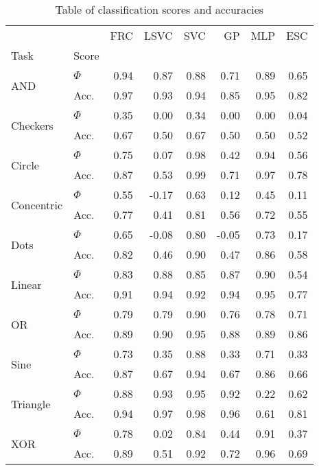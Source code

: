 \begin{table}
\centering
\caption{Table of classification scores and accuracies}
\label{tbl:classification_scores}
\begin{tabular}{llrrrrrr}
\toprule
 &  & FRC & LSVC & SVC & GP & MLP & ESC \\
Task & Score &  &  &  &  &  &  \\
\midrule
\multirow[t]{2}{*}{AND} & $\Phi$ & 0.94 & 0.87 & 0.88 & 0.71 & 0.89 & 0.65 \\
 & Acc. & 0.97 & 0.93 & 0.94 & 0.85 & 0.95 & 0.82 \\
\cline{1-8}
\multirow[t]{2}{*}{Checkers} & $\Phi$ & 0.35 & 0.00 & 0.34 & 0.00 & 0.00 & 0.04 \\
 & Acc. & 0.67 & 0.50 & 0.67 & 0.50 & 0.50 & 0.52 \\
\cline{1-8}
\multirow[t]{2}{*}{Circle} & $\Phi$ & 0.75 & 0.07 & 0.98 & 0.42 & 0.94 & 0.56 \\
 & Acc. & 0.87 & 0.53 & 0.99 & 0.71 & 0.97 & 0.78 \\
\cline{1-8}
\multirow[t]{2}{*}{Concentric} & $\Phi$ & 0.55 & -0.17 & 0.63 & 0.12 & 0.45 & 0.11 \\
 & Acc. & 0.77 & 0.41 & 0.81 & 0.56 & 0.72 & 0.55 \\
\cline{1-8}
\multirow[t]{2}{*}{Dots} & $\Phi$ & 0.65 & -0.08 & 0.80 & -0.05 & 0.73 & 0.17 \\
 & Acc. & 0.82 & 0.46 & 0.90 & 0.47 & 0.86 & 0.58 \\
\cline{1-8}
\multirow[t]{2}{*}{Linear} & $\Phi$ & 0.83 & 0.88 & 0.85 & 0.87 & 0.90 & 0.54 \\
 & Acc. & 0.91 & 0.94 & 0.92 & 0.94 & 0.95 & 0.77 \\
\cline{1-8}
\multirow[t]{2}{*}{OR} & $\Phi$ & 0.79 & 0.79 & 0.90 & 0.76 & 0.78 & 0.71 \\
 & Acc. & 0.89 & 0.90 & 0.95 & 0.88 & 0.89 & 0.86 \\
\cline{1-8}
\multirow[t]{2}{*}{Sine} & $\Phi$ & 0.73 & 0.35 & 0.88 & 0.33 & 0.71 & 0.33 \\
 & Acc. & 0.87 & 0.67 & 0.94 & 0.67 & 0.86 & 0.66 \\
\cline{1-8}
\multirow[t]{2}{*}{Triangle} & $\Phi$ & 0.88 & 0.93 & 0.95 & 0.92 & 0.22 & 0.62 \\
 & Acc. & 0.94 & 0.97 & 0.98 & 0.96 & 0.61 & 0.81 \\
\cline{1-8}
\multirow[t]{2}{*}{XOR} & $\Phi$ & 0.78 & 0.02 & 0.84 & 0.44 & 0.91 & 0.37 \\
 & Acc. & 0.89 & 0.51 & 0.92 & 0.72 & 0.96 & 0.69 \\
\cline{1-8}
\bottomrule
\end{tabular}
\end{table}
